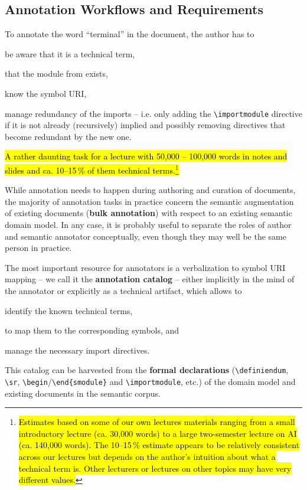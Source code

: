 \documentclass[runningheads]{llncs}
\def\edited#1{\hl{#1}}
\begin{document}
\subsection{Annotation Workflows and Requirements}\label{sec:workflows}

To annotate the word ``terminal'' in the document, the author has to 
\begin{inparaenum}[\em i\rm)]
\item be aware that it is a
technical term, 
\item that the module from  exists,
\item know the symbol URI, 
\item manage redundancy of the imports -- i.e. only adding the \lstinline|\importmodule|
  directive if it is not already (recursively) implied and possibly removing directives
  that become redundant by the new one.
\end{inparaenum}
\edited{A rather daunting task for a lecture with 50,000 -- 100,000 words in notes and slides and ca. 10--15\,\% of them technical terms.\footnote{
    \edited{
        Estimates based on some of our own lectures materials
        ranging from a small introductory lecture (ca. 30,000 words)
        to a large two-semester lecture on AI (ca. 140,000 words).
        The 10--15\,\% estimate appears to be relatively consistent across our lectures
        but depends on the author's intuition about what a technical term is.
        Other lecturers or lectures on other topics may have very different values.
    }
}}

While annotation needs to happen during authoring and curation of documents, the majority
of annotation tasks in practice concern the semantic augmentation of existing documents
(\textbf{bulk annotation}) with respect to an existing semantic domain model. In any case,
it is probably useful to separate the roles of author and semantic annotator conceptually,
even though they may well be the same person in practice.

The most important resource for annotators is a verbalization to symbol URI mapping -- we
call it the \textbf{annotation catalog} -- either implicitly in the mind of the annotator
or explicitly as a technical artifact, which allows to
\begin{inparaenum}[\em i\rm)]
\item identify the known technical terms,
\item to map them to the corresponding symbols, and 
\item manage the necessary import directives.
\end{inparaenum}
This catalog can be harvested from the \textbf{formal declarations}
(\lstinline|\definiendum|, \lstinline|\sr|, \lstinline[language={}]|\begin|/\lstinline[language={}]|\end{smodule}| and
\lstinline|\importmodule|, etc.) of the domain model and existing documents in the
semantic corpus.
\end{document}
